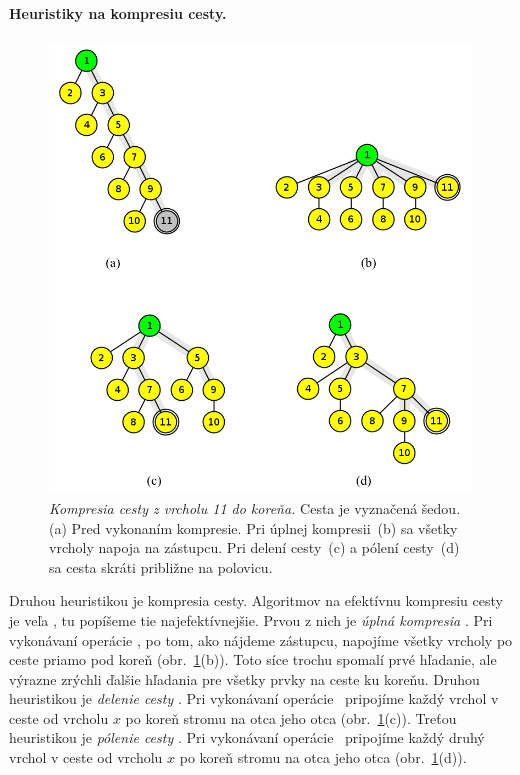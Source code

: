 \paragraph{Heuristiky na kompresiu cesty.}

\begin{figure}
\includegraphics[width=\columnwidth]{obrazky/komp.png}
\caption{\emph{Kompresia cesty z vrcholu 11 do koreňa.} 
Cesta je vyznačená šedou. 
(a) Pred vykonaním kompresie. Pri úplnej kompresii~(b) sa všetky vrcholy 
napoja na zástupcu. Pri delení cesty~(c) a pólení cesty~(d) sa cesta skráti 
približne na polovicu.} 
\label{img:komp} 
\end{figure}

Druhou heuristikou je kompresia cesty. Algoritmov na efektívnu kompresiu 
cesty je veľa \citep{paths2}, tu popíšeme tie najefektívnejšie. Prvou z nich 
je \emph{úplná kompresia} \citep{comp1}. Pri vykonávaní operácie \find, po tom, 
ako nájdeme zástupcu, napojíme všetky vrcholy po ceste priamo pod koreň (obr.~\ref{img:komp}(b)).
Toto síce trochu spomalí prvé hľadanie, ale výrazne zrýchli ďalšie hľadania pre
všetky prvky na ceste ku koreňu. Druhou heuristikou je \emph{delenie cesty} \citep{comp2}. Pri vykonávaní 
operácie \find\ pripojíme každý vrchol v ceste od vrcholu $x$ po koreň stromu
na otca jeho otca (obr.~\ref{img:komp}(c)). Treťou heuristikou je \emph{pólenie cesty} \citep{comp2}.
Pri vykonávaní operácie \find\  pripojíme každý druhý vrchol v ceste od vrcholu
$x$ po koreň stromu na otca jeho otca (obr.~\ref{img:komp}(d)).

